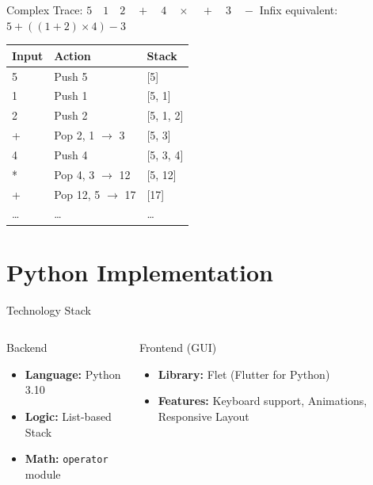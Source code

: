 \documentclass[aspectratio=169]{beamer} %
\begin{document}
	\begin{frame}{Complex Trace: $5 \quad 1 \quad 2 \quad + \quad 4 \quad \times \quad + \quad 3 \quad -$}
		Infix equivalent: $5 + ((1 + 2) \times 4) - 3$
		\vspace{0.5cm}
		\begin{table}
			\centering
			\small
			\begin{tabular}{l l l}
				\toprule
				\textbf{Input} & \textbf{Action} & \textbf{Stack} \\
				\midrule
				5 & Push 5 & [5] \\
				1 & Push 1 & [5, 1] \\
				2 & Push 2 & [5, 1, 2] \\
				+ & Pop 2, 1 $\rightarrow$ 3 & [5, 3] \\
				4 & Push 4 & [5, 3, 4] \\
				* & Pop 4, 3 $\rightarrow$ 12 & [5, 12] \\
				+ & Pop 12, 5 $\rightarrow$ 17 & [17] \\
				\dots & \dots & \dots \\
				\bottomrule
			\end{tabular}
		\end{table}
	\end{frame}
	
	\section{Python Implementation}
	
	\begin{frame}{Technology Stack}
		\begin{columns}
			\begin{block}{Backend}
				\begin{itemize}
					\item \textbf{Language:} Python 3.10
					\item \textbf{Logic:} List-based Stack
					\item \textbf{Math:} \texttt{operator} module
				\end{itemize}
			\end{block}
			
			\begin{block}{Frontend (GUI)}
				\begin{itemize}
					\item \textbf{Library:} Flet (Flutter for Python)
					\item \textbf{Features:} Keyboard support, Animations, Responsive Layout
				\end{itemize}
			\end{block}
		\end{columns}
	\end{frame}
	
\end{document}

